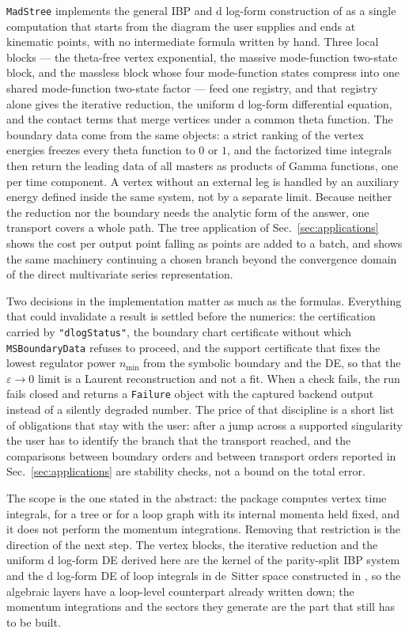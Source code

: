 \documentclass[11pt,a4paper]{article}
\begin{document}
\texttt{MadStree} implements the general IBP and d log-form construction of
\cite{Chen:2023iix,Chen:2024glu} as a single computation that starts from the diagram the user
supplies and ends at kinematic points, with no intermediate formula written by hand. Three local
blocks --- the theta-free vertex exponential, the massive mode-function two-state block, and the massless block
whose four mode-function states compress into one shared mode-function two-state factor --- feed one registry, and that registry
alone gives the iterative reduction, the uniform d log-form differential equation, and the contact
terms that merge vertices under a common theta function. The boundary data come from the same
objects: a strict ranking of the vertex energies freezes every theta function to $0$ or $1$, and the
factorized time integrals then return the leading data of all masters as products of Gamma
functions, one per time component. A vertex without an external leg is handled by an auxiliary
energy defined inside the same system, not by a separate limit. Because neither the
reduction nor the boundary needs the analytic form of the answer, one transport covers a whole
path. The tree application of Sec.~\ref{sec:applications} shows the cost per output point falling as
points are added to a batch, and shows the same machinery continuing a chosen branch beyond the
convergence domain of the direct multivariate series representation.

Two decisions in the implementation matter as much as the formulas. Everything that could invalidate
a result is settled before the numerics: the certification carried by \texttt{"dlogStatus"}, the
boundary chart certificate without which \texttt{MSBoundaryData} refuses to proceed, and the support
certificate that fixes the lowest regulator power $n_{\min}$ from the symbolic boundary and the DE,
so that the $\varepsilon\to0$ limit is a Laurent reconstruction and not a fit. When a check fails,
the run fails closed and returns a \texttt{Failure} object with the captured backend output instead
of a silently degraded number. The price of that discipline is a short list of obligations that stay
with the user: after a jump across a supported singularity the user has to identify the branch that
the transport reached, and the comparisons between boundary orders and between transport orders
reported in Sec.~\ref{sec:applications} are stability checks, not a bound on the total error.

The scope is the one stated in the abstract: the package computes vertex time integrals, for a
tree or for a loop graph with its internal momenta held fixed, and it does not perform the momentum
integrations. Removing that restriction is the direction of the next step. The vertex blocks, the
iterative reduction and the uniform d log-form DE derived here are the kernel of the parity-split
IBP system and the d log-form DE of loop integrals in de~Sitter space constructed in
\cite{Chen:2026dqp}, so the algebraic layers have a loop-level counterpart already written down;
the momentum integrations and the sectors they generate are the part that still has to be built.
\end{document}
